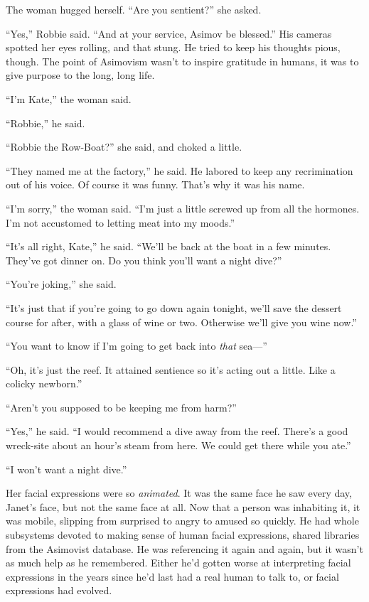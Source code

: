 The woman hugged herself. “Are you sentient?” she asked.

“Yes,” Robbie said. “And at your service, Asimov be blessed.” His
cameras spotted her eyes rolling, and that stung. He tried to keep
his thoughts pious, though. The point of Asimovism wasn’t to
inspire gratitude in humans, it was to give purpose to the long,
long life.

“I’m Kate,” the woman said.

“Robbie,” he said.

“Robbie the Row-Boat?” she said, and choked a little.

“They named me at the factory,” he said. He labored to keep any
recrimination out of his voice. Of course it was funny. That’s why
it was his name.

“I’m sorry,” the woman said. “I’m just a little screwed up from all
the hormones. I’m not accustomed to letting meat into my moods.”

“It’s all right, Kate,” he said. “We’ll be back at the boat in a
few minutes. They’ve got dinner on. Do you think you’ll want a
night dive?”

“You’re joking,” she said.

“It’s just that if you’re going to go down again tonight, we’ll
save the dessert course for after, with a glass of wine or two.
Otherwise we’ll give you wine now.”

“You want to know if I’m going to get back into \emph{that} sea—”

“Oh, it’s just the reef. It attained sentience so it’s acting out a
little. Like a colicky newborn.”

“Aren’t you supposed to be keeping me from harm?”

“Yes,” he said. “I would recommend a dive away from the reef.
There’s a good wreck-site about an hour’s steam from here. We could
get there while you ate.”

“I won’t want a night dive.”

Her facial expressions were so \emph{animated}. It was the same
face he saw every day, Janet’s face, but not the same face at all.
Now that a person was inhabiting it, it was mobile, slipping from
surprised to angry to amused so quickly. He had whole subsystems
devoted to making sense of human facial expressions, shared
libraries from the Asimovist database. He was referencing it again
and again, but it wasn’t as much help as he remembered. Either he’d
gotten worse at interpreting facial expressions in the years since
he’d last had a real human to talk to, or facial expressions had
evolved.

